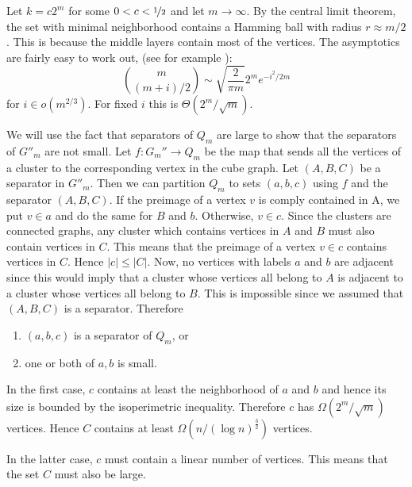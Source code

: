 \documentclass[a4paper,12pt]{book}
\theoremstyle{plain}
\theoremstyle{definition}
\begin{document}
Let $k = c2^m$ for some $0<c<\nicefrac{1}{2}$ and let $m \rightarrow \infty$. By the central limit theorem, 
the set with minimal neighborhood contains a Hamming ball with radius $r \approx m/2$. This is because the middle layers contain most of the vertices.
The asymptotics are fairly easy to work out, (see for example \cite{Spencer:Asymptopia}):
\begin{equation}
\binom{m}{(m+i)/2} \sim \sqrt{\frac{2}{\pi m}} 2^m e^{-i^2/2m}  
\end{equation}
for $i \in o(m^{2/3})$. For fixed $i$ this is $\Theta(2^m/\sqrt{m})$.


We will use the fact that separators of $Q_m$ are large to show that the separators of $G''_m$ are not small.
Let $f: G_m'' \rightarrow Q_m$ 
be the map that sends all the vertices of a cluster to the corresponding vertex 
in the cube graph. 
Let $(A,B,C)$ be a separator in $G''_m$. Then we can partition
$Q_m$ to sets $(a,b,c)$ using $f$ and the separator $(A,B,C)$. If the preimage of a vertex $v$ is comply contained in A, we 
put $v \in a$ and do the same for $B$ and $b$. Otherwise, $v \in c$. Since the clusters are connected 
graphs, any cluster which contains vertices in $A$ and $B$ must also contain 
vertices in $C$. This means that the preimage of a vertex $v \in c$ contains vertices in $C$. Hence $|c| \leq |C|$. 
Now, no vertices with labels $a$ and $b$ are adjacent since this would imply 
that a cluster whose vertices all belong to $A$ is adjacent to a cluster whose vertices all belong to 
$B$. This is impossible since we assumed that $(A,B,C)$ is a separator. Therefore
\begin{enumerate}
 \item $(a,b,c)$ is a separator of $Q_m$, or
\item one or both of $a,b$ is small.
\end{enumerate}
In the first case, $c$ contains at least the neighborhood of $a$ and $b$ and 
hence its size is bounded by the isoperimetric inequality. Therefore $c$ has 
$\Omega(2^m/\sqrt{m})$ vertices. Hence $C$ contains at least $\Omega(n/(\log 
n)^{\frac{3}{2}})$ vertices.

In the latter case, $c$ must contain a linear number of vertices. This means 
that the set $C$ must also be large.  
\end{document}
